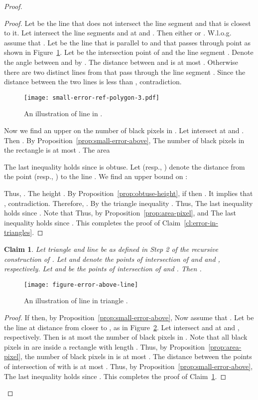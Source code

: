 \documentclass[11pt,english]{article}
\newtheorem{claim}[theorem]{Claim}
\numberwithin{figure}{section}
\begin{document}
\begin{proof}
{\begin{proof}
Let  be the line that does not intersect the line segment  and that is closest to it. Let  intersect the line segments  and  at  and . Then either  or . W.l.o.g. assume that .
Let  be the line that is parallel to  and that passes through point  as shown in Figure~\ref{fig:small-error-ref-poly-3}. Let  be the intersection point of  and the line segment . Denote the angle between  and  by . The distance between  and  is at  most . Otherwise there are two distinct lines from  that pass through the line segment . Since  the distance between the two lines is less than , contradiction.

\begin{figure}
\centering
\texttt{[image: small-error-ref-polygon-3.pdf]}
\caption{ An illustration of line  in .}
\label{fig:small-error-ref-poly-3}
\end{figure}

Now we find an upper on the number of black pixels in . Let  intersect  at  and . Then . By Proposition~\ref{prop:small-error-above},  The number of black pixels in the rectangle  is at most . The area

The last inequality holds since  is obtuse. Let  (resp., ) denote the distance from the point  (resp., ) to the line . We find an upper bound on :

 Thus, . The height . By Proposition~\ref{prop:obtuse-height}, if  then . It implies that , contradiction. Therefore, . By the triangle inequality . Thus,
 The last inequality holds since . Note that  Thus, by Proposition~\ref{prop:area-pixel}, 
and  
The last inequality holds since . This completes the proof of Claim~\ref{cl:error-in-triangles}.
\end{proof}
\begin{claim}
\label{cl:small-area-above-line}
Let triangle  and line  be as defined in Step 2 of the recursive construction of . Let  and  denote the points of intersection of  and  and , respectively. Let  and  be the points of intersection of  and . Then .
\end{claim}
\begin{figure}[ht]
\centering
\texttt{[image: figure-error-above-line]}
\caption{ An illustration of line  in triangle .}
\label{fig:error-above-l}
\end{figure}

\begin{proof}
If  then, by Proposition~\ref{prop:small-error-above},  Now assume that . Let  be the line at distance  from  closer to , as in Figure~\ref{fig:error-above-l}. Let  intersect  and  at  and , respectively. Then  is at most the number of black pixels in . Note that all black pixels in  are inside a rectangle with length . Thus, by Proposition~\ref{prop:area-pixel}, the number of black pixels in  is at most . The distance between the points of intersection of  with  is at most . Thus, by Proposition~\ref{prop:small-error-above},
 The last inequality holds since . This completes the proof of Claim~\ref{cl:small-area-above-line}.
\end{proof}


}
\end{proof}
\end{document}
